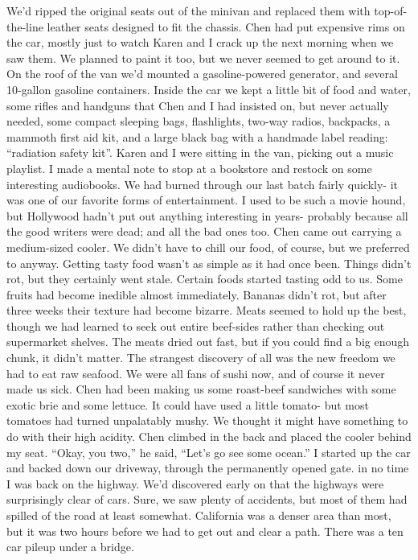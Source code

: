 \documentclass[a4paper]{article}
\begin{document}
We’d ripped the original seats out of the minivan and replaced them with top-of-the-line leather seats designed to fit the chassis. Chen had put expensive rims on the car, mostly just to watch Karen and I crack up the next morning when we saw them. We planned to paint it too, but we never seemed to get around to it.
On the roof of the van we’d mounted a gasoline-powered generator, and several 10-gallon gasoline containers. Inside the car we kept a little bit of food and water, some rifles and handguns that Chen and I had insisted on, but never actually needed, some compact sleeping bags, flashlights, two-way radios, backpacks, a mammoth first aid kit, and a large black bag with a handmade label reading: “radiation safety kit”.
Karen and I were sitting in the van, picking out a music playlist. I made a mental note to stop at a bookstore and restock on some interesting audiobooks. We had burned through our last batch fairly quickly- it was one of our favorite forms of entertainment. I used to be such a movie hound, but Hollywood hadn’t put out anything interesting in years- probably because all the good writers were dead; and all the bad ones too.
Chen came out carrying a medium-sized cooler. We didn’t have to chill our food, of course, but we preferred to anyway. Getting tasty food wasn’t as simple as it had once been. Things didn’t rot, but they certainly went stale. Certain foods started tasting odd to us. Some fruits had become inedible almost immediately. Bananas didn't rot, but after three weeks their texture had become bizarre.
Meats seemed to hold up the best, though we had learned to seek out entire beef-sides rather than checking out supermarket shelves. The meats dried out fast, but if you could find a big enough chunk, it didn’t matter. The strangest discovery of all was the new freedom we had to eat raw seafood. We were all fans of sushi now, and of course it never made us sick.
Chen had been making us some roast-beef sandwiches with some exotic brie and some lettuce. It could have used a little tomato- but most tomatoes had turned unpalatably mushy. We thought it might have something to do with their high acidity.
Chen climbed in the back and placed the cooler behind my seat. “Okay, you two,” he said, “Let’s go see some ocean.”
I started up the car and backed down our driveway, through the permanently opened gate. in no time I was back on the highway.
We’d discovered early on that the highways were surprisingly clear of cars. Sure, we saw plenty of accidents, but most of them had spilled of the road at least somewhat. California was a denser area than most, but it was two hours before we had to get out and clear a path. There was a ten car pileup under a bridge.
\end{document}
